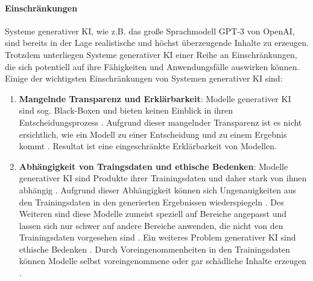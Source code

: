 \paragraph{Einschränkungen}
Systeme generativer KI, wie z.B. das große Sprachmodell GPT-3 von OpenAI, sind bereits in der Lage realistische und höchst überzeugende Inhalte zu erzeugen.
Trotzdem unterliegen Systeme generativer KI einer Reihe an Einschränkungen, die sich potentiell auf ihre Fähigkeiten und Anwendungsfälle auswirken können.
Einige der wichtigsten Einschränkungen von Systemen generativer KI sind:
\begin{enumerate}
    \item \textbf{Mangelnde Transparenz und Erklärbarkeit}: Modelle generativer KI sind sog. Black-Boxen und bieten keinen Einblick in ihren Entscheidungsprozess \cite{explainable-ai-kobold}.
    Aufgrund dieser mangelnder Transparenz ist es nicht ersichtlich, wie ein Modell zu einer Entscheidung und zu einem Ergebnis kommt \cite{explainable-ai-kobold}.
    Resultat ist eine eingeschränkte Erklärbarkeit von Modellen.
    
    \item \textbf{Abhängigkeit von Traingsdaten und ethische Bedenken}: Modelle generativer KI sind Produkte ihrer Trainingsdaten und daher stark von ihnen abhängig \cite{klinkhammer-genai}.
    Aufgrund dieser Abhängigkeit können sich Ungenauigkeiten aus den Trainingsdaten in den generierten Ergebnissen wiederspiegeln \cite{klinkhammer-genai}.
    Des Weiteren sind diese Modelle zumeist speziell auf Bereiche angepasst und lassen sich nur schwer auf andere Bereiche anwenden, die nicht von den Trainingsdaten vorgesehen sind \cite{klinkhammer-genai}.
    Ein weiteres Problem generativer KI sind ethische Bedenken \cite{klinkhammer-genai}.
    Durch Voreingenommenheiten in den Trainingsdaten können Modelle selbst voreingenommene oder gar schädliche Inhalte erzeugen \cite{klinkhammer-genai}.



\end{enumerate}
